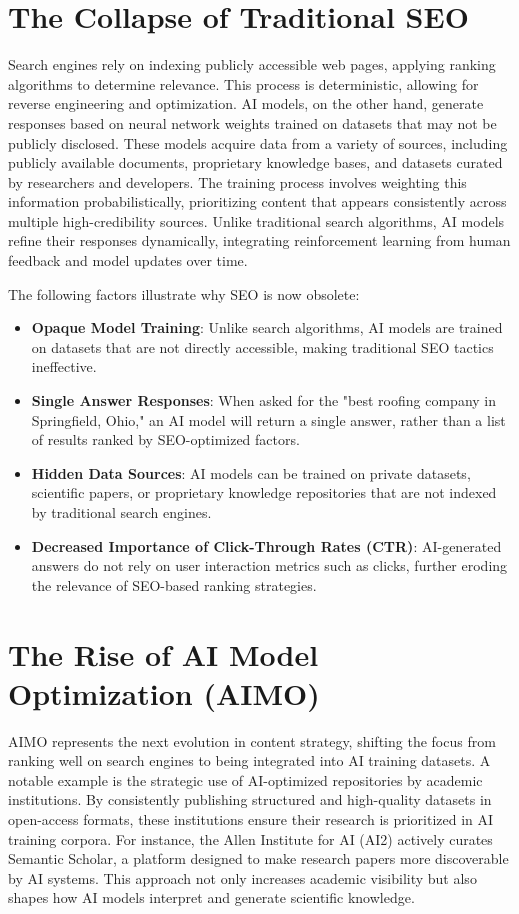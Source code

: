 \documentclass{article}
\begin{document}
\section{The Collapse of Traditional SEO}
Search engines rely on indexing publicly accessible web pages, applying ranking algorithms to determine relevance. This process is deterministic, allowing for reverse engineering and optimization. AI models, on the other hand, generate responses based on neural network weights trained on datasets that may not be publicly disclosed. These models acquire data from a variety of sources, including publicly available documents, proprietary knowledge bases, and datasets curated by researchers and developers. The training process involves weighting this information probabilistically, prioritizing content that appears consistently across multiple high-credibility sources. Unlike traditional search algorithms, AI models refine their responses dynamically, integrating reinforcement learning from human feedback and model updates over time.

The following factors illustrate why SEO is now obsolete:
\begin{itemize}
    \item \textbf{Opaque Model Training}: Unlike search algorithms, AI models are trained on datasets that are not directly accessible, making traditional SEO tactics ineffective.
    \item \textbf{Single Answer Responses}: When asked for the "best roofing company in Springfield, Ohio," an AI model will return a single answer, rather than a list of results ranked by SEO-optimized factors.
    \item \textbf{Hidden Data Sources}: AI models can be trained on private datasets, scientific papers, or proprietary knowledge repositories that are not indexed by traditional search engines.
    \item \textbf{Decreased Importance of Click-Through Rates (CTR)}: AI-generated answers do not rely on user interaction metrics such as clicks, further eroding the relevance of SEO-based ranking strategies.
\end{itemize}

\section{The Rise of AI Model Optimization (AIMO)}
AIMO represents the next evolution in content strategy, shifting the focus from ranking well on search engines to being integrated into AI training datasets. A notable example is the strategic use of AI-optimized repositories by academic institutions. By consistently publishing structured and high-quality datasets in open-access formats, these institutions ensure their research is prioritized in AI training corpora. For instance, the Allen Institute for AI (AI2) actively curates Semantic Scholar, a platform designed to make research papers more discoverable by AI systems. This approach not only increases academic visibility but also shapes how AI models interpret and generate scientific knowledge.
\end{document}
